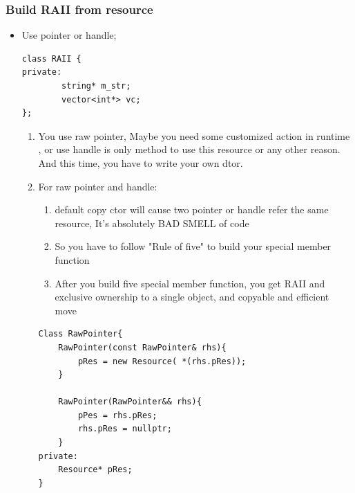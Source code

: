 \documentclass[a4paper,11pt,twoside]{book}
\begin{document}
\subsubsection{Build RAII from resource}
\begin{itemize}
		\item Use pointer or handle; 
\begin{lstlisting}[numbers=none]
class RAII {
private:
		string* m_str;
		vector<int*> vc;
};
\end{lstlisting}
			\begin{enumerate}
				\item You use raw pointer, Maybe you need some customized action in runtime , or use handle is only method to use this resource or any other reason. And this time, you have to write your own dtor.
				
				\item For raw pointer and handle: 
				\begin{enumerate}
					\item default copy ctor will cause two pointer or handle refer the same resource, It's absolutely BAD SMELL of code
					\item So you have to follow "Rule of five" to build your special member function
					\item After you build five special member function, you get RAII and exclusive ownership to a single object, and copyable and efficient move
				\end{enumerate}
			
\begin{lstlisting}[numbers=none]
Class RawPointer{
	RawPointer(const RawPointer& rhs){
		pRes = new Resource( *(rhs.pRes));
	}
				
	RawPointer(RawPointer&& rhs){
		pPes = rhs.pRes;
		rhs.pRes = nullptr;
	}
private:
	Resource* pRes;
}
\end{lstlisting}
			\end{enumerate}

\end{itemize}
\end{document}
